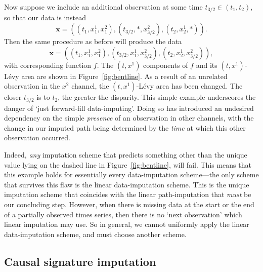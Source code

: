 \documentclass{article}
\begin{document}
Now suppose we include an additional observation at some time $t_{3/2} \in (t_1, t_2)$, so that our data is instead
%
\begin{equation}\label{eq:flaw2}
    \mathbf{x} = ((t_1, x_1^1, x_1^2), (t_{3/2}, *, x_{3/2}^2), (t_2, x_2^1, *)).
\end{equation}
%
Then the same procedure as before will produce the data
%
\begin{equation*}
    \mathbf{x} = ((t_1, x_1^1, x_1^2), (t_{3/2}, x_1^1, x_{3/2}^2), (t_2, x_2^1, x_{3/2}^2)),
\end{equation*}
%
with corresponding function $f$. The $(t, x^1)$ components of $f$ and
its $(t, x^1)$-L{\'e}vy area are shown in Figure~\ref{fig:bentline}. As
a result of an unrelated observation in the $x^2$ channel, the $(t,
x^1)$-L{\'e}vy area has been changed.
%
The closer $t_{3/2}$ is to $t_2$, the greater the disparity.
%
This simple example underscores the danger of `just forward-fill
data-imputing'. Doing so has introduced an undesired dependency on the
simple \emph{presence} of an observation in other channels, with the
change in our imputed path being determined by the \emph{time} at which
this other observation occurred.

Indeed, \emph{any} imputation scheme that predicts something other than
the unique value lying on the dashed line in Figure~\ref{fig:bentline},
will fail. This means that this example holds for essentially every
data-imputation scheme---the only scheme that survives this flaw is the
linear data-imputation scheme. This is the unique imputation scheme
that coincides with the linear path-imputation that \emph{must} be our
concluding step.
%
However, when there is missing data at the start or the end of
a partially observed times series, then there is no `next observation'
which linear imputation may use. So in general, we cannot uniformly
apply the linear data-imputation scheme, and must choose another scheme.

\subsection{Causal signature imputation}\label{sec:Causal signature imputation}
\end{document}
